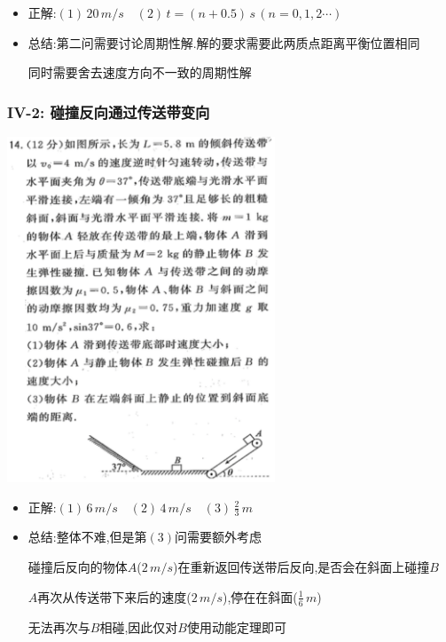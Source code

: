 \documentclass{article}
\begin{document}
\begin{itemize}
    \item 正解:\quad $(1) \, 20 \, m/s \quad (2) \, t = (n + 0.5) \, s \, (n = 0,1,2 \cdots)$
    \item 总结:\quad 第二问需要讨论周期性解.解的要求需要此两质点距离平衡位置相同
    
    \hspace{3.2em}同时需要舍去速度方向不一致的周期性解
\end{itemize}

\vspace{2em}
\newpage

\subsubsection{IV-2: 碰撞反向通过传送带变向}
\includegraphics[width=0.6\textwidth,keepaspectratio]{./pictures/3.12-6.png}

\begin{itemize}
    \item 正解:\quad $(1) \, 6 \, m/s \quad (2) \, 4 \, m/s \quad (3) \, \frac{2}{3} \, m$
    \item 总结:\quad 整体不难,但是第$(3)$问需要额外考虑
    
    \hspace{3.2em}碰撞后反向的物体$A$($2 \, m/s$)在重新返回传送带后反向,是否会在斜面上碰撞$B$
    
    \hspace{3.2em}$A$再次从传送带下来后的速度($2 \, m /s$),停在在斜面($\frac{1}{6} \, m$)
    
    \hspace{3.2em}无法再次与$B$相碰,因此仅对$B$使用动能定理即可
\end{itemize}
\end{document}
